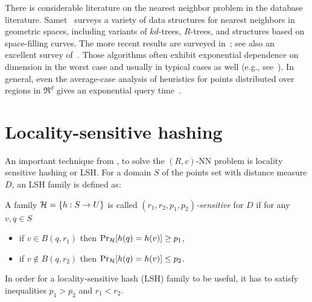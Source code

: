 \documentclass[12pt]{article}
\begin{document}
There is considerable literature on the nearest neighbor problem in the database literature.
Samet~\cite{samet} surveys a variety of data structures
for nearest neighbors in geometric spaces, including variants of
$kd$-trees, $R$-trees, and structures based on space-filling curves.
The more recent results are surveyed in~\cite{SRF}; see also an excellent survey of~\cite{BK2}. 
Those algorithms often exhibit exponential dependence on dimension in the worst case and
usually in typical cases as well (e.g., see~\cite{AMN}).
In general, even the average-case
analysis of heuristics for points distributed over regions in $\Re^d$
gives an exponential query time~\cite{bentley,FBF,samet}.
\fi

\section{Locality-sensitive hashing}
\label{subsec:lsh}

An important technique from \cite{IM}, to solve the
$(R,c)$-NN problem is locality sensitive hashing or LSH.
For a domain $S$ of the points set with distance measure $D$, an LSH family
is defined as:
\begin{defn}
\label{defn:lsh}
A family ${\cal H} = \{h: S \to U\}$ is called
$(r_1,r_2,p_1,p_2)${\em-sensitive} for $D$  if for any $v, q \in S$
\vspace*{-0.1in}
\begin{itemize}
\item if $v \in B(q,r_1)$ then $\Pr_{\cal H}[h(q)=h(v)] \ge p_1$,
\item if $v \notin B(q,r_2)$ then $\Pr_{\cal H}[h(q)=h(v)] \le p_2$.
\end{itemize}
\end{defn}
In order for a locality-sensitive hash (LSH) family to be useful, it has to satisfy
inequalities $p_1>p_2$ and $r_1<r_2$.
\end{document}
